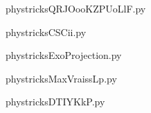     

    \clearpage
    


    \newcommand{\CaptionFigQRJOooKZPUoLlF}{<+Type your caption here+>}
    \begin{center}
        
    \end{center}
    phystricksQRJOooKZPUoLlF.py

    

    \clearpage
    


    \newcommand{\CaptionFigCSCii}{<+Type your caption here+>}
    \begin{center}
        
    \end{center}
    phystricksCSCii.py

    

    \clearpage
    


    \newcommand{\CaptionFigExoProjection}{<+Type your caption here+>}
    \begin{center}
        
    \end{center}
    phystricksExoProjection.py

    

    \clearpage
    


    \newcommand{\CaptionFigMaxVraissLp}{<+Type your caption here+>}
    \begin{center}
        
    \end{center}
    phystricksMaxVraissLp.py

    

    \clearpage
    


    \newcommand{\CaptionFigDTIYKkP}{<+Type your caption here+>}
    \begin{center}
        
    \end{center}
    phystricksDTIYKkP.py

    

    \clearpage
    


